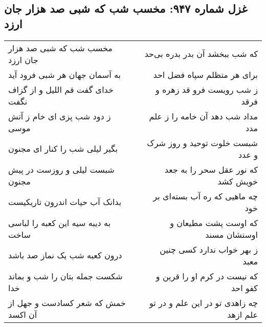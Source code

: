 \begin{center}
\section*{غزل شماره ۹۴۷: مخسب شب که شبی صد هزار جان ارزد}
\label{sec:0947}
\begin{longtable}{l p{0.5cm} r}
مخسب شب که شبی صد هزار جان ارزد
&&
که شب ببخشد آن بدر بدره بی‌حد
\\
به آسمان جهان هر شبی فرود آید
&&
برای هر متظلم سپاه فضل احد
\\
خدای گفت قم اللیل و از گزاف نگفت
&&
ز شب رویست فرو قد زهره و فرقد
\\
ز دود شب پزی ای خام ز آتش موسی
&&
مداد شب دهد آن خامه را ز علم مدد
\\
بگیر لیلی شب را کنار ای مجنون
&&
شبست خلوت توحید و روز شرک و عدد
\\
شبست لیلی و روزست در پیش مجنون
&&
که نور عقل سحر را به جعد خویش کشد
\\
بدانک آب حیات اندرون تاریکیست
&&
چه ماهیی که ره آب بسته‌ای بر خود
\\
به دیبه سیه این کعبه را لباسی ساخت
&&
که اوست پشت مطیعان و اوستشان مسند
\\
درون کعبه شب یک نماز صد باشد
&&
ز بهر خواب ندارد کسی چنین معبد
\\
شکست جمله بتان را شب و بماند خدا
&&
که نیست در کرم او را قرین و کفو احد
\\
خمش که شعر کسادست و جهل از آن اکسد
&&
چه زاهدی تو در این علم و در تو علم ازهد
\\
\end{longtable}
\end{center}
